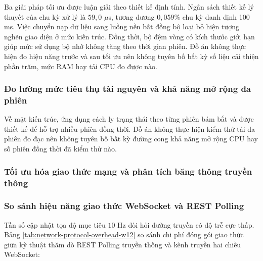 Ba giải pháp tối ưu được luận giải theo thiết kế định tính. Ngân sách thiết kế lý thuyết của chu kỳ xử lý là $59{,}0$ $\mu$s, tương đương $0{,}059\%$ chu kỳ danh định 100 ms. Việc chuyển nạp dữ liệu sang luồng nền bất đồng bộ loại bỏ hiện tượng nghẽn giao diện ở mức kiến trúc. Đồng thời, bộ đệm vòng có kích thước giới hạn giúp mức sử dụng bộ nhớ không tăng theo thời gian phiên. Đồ án không thực hiện đo hiệu năng trước và sau tối ưu nên không tuyên bố bất kỳ số liệu cải thiện phần trăm, mức RAM hay tải CPU đo được nào.

\subsubsection{Đo lường mức tiêu thụ tài nguyên và khả năng mở rộng đa phiên}

\hspace{0.5cm} Về mặt kiến trúc, ứng dụng cách ly trạng thái theo từng phiên bám bắt và được thiết kế để hỗ trợ nhiều phiên đồng thời. Đồ án không thực hiện kiểm thử tải đa phiên đo đạc nên không tuyên bố bất kỳ đường cong khả năng mở rộng CPU hay số phiên đồng thời đã kiểm thử nào.

\subsubsection{Tối ưu hóa giao thức mạng và phân tích băng thông truyền thông}

\subsubsection{So sánh hiệu năng giao thức WebSocket và REST Polling}

\hspace{0.5cm} Tần số cập nhật tọa độ mục tiêu $10$ Hz đòi hỏi đường truyền có độ trễ cực thấp. Bảng \ref{tab:network-protocol-overhead-w12} so sánh chi phí đóng gói giao thức giữa kỹ thuật thăm dò REST Polling truyền thống và kênh truyền hai chiều WebSocket:

